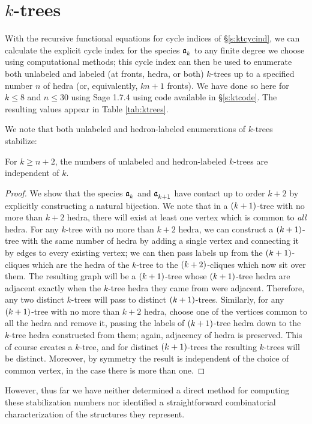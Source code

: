 \documentclass[distribution,draft]{brandiss} %
\numberwithin{section}{chapter}
\numberwithin{figure}{chapter}
\begin{document}
\section{$k$-trees}\label{s:ktenum}
With the recursive functional equations for cycle indices of \S \ref{s:ktcycind}, we can calculate the explicit cycle index for the species $\mathfrak{a}_{k}^{}$ to any finite degree we choose using computational methods; this cycle index can then be used to enumerate both unlabeled and labeled (at fronts, hedra, or both) $k$-trees up to a specified number $n$ of hedra (or, equivalently, $kn + 1$ fronts).
We have done so here for $k \leq 8$ and $n \leq 30$ using Sage 1.7.4 \cite{sage} using code available in \S \ref{s:ktcode}.
The resulting values appear in Table \ref{tab:ktrees}.

We note that both unlabeled and hedron-labeled enumerations of $k$-trees stabilize:
\begin{theorem}
  \label{thm:ktreestab}
  For $k \geq n + 2$, the numbers of unlabeled and hedron-labeled $k$-trees are independent of $k$.
\end{theorem}
\begin{proof}
  We show that the species $\mathfrak{a}_{k}^{}$ and $\mathfrak{a}_{k+1}^{}$ have contact up to order $k+2$ by explicitly constructing a natural bijection.
  We note that in a $\left( {k+1} \right)$-tree with no more than $k+2$ hedra, there will exist at least one vertex which is common to \emph{all} hedra.
  For any $k$-tree with no more than $k+2$ hedra, we can construct a $\left( {k+1} \right)$-tree with the same number of hedra by adding a single vertex and connecting it by edges to every existing vertex; we can then pass labels up from the $\left( {k+1} \right)$-cliques which are the hedra of the $k$-tree to the $\left( {k+2} \right)$-cliques which now sit over them.
  The resulting graph will be a $\left( {k+1} \right)$-tree whose $\left( {k+1} \right)$-tree hedra are adjacent exactly when the $k$-tree hedra they came from were adjacent.
  Therefore, any two distinct $k$-trees will pass to distinct $\left( {k+1} \right)$-trees.
  Similarly, for any $\left( {k+1} \right)$-tree with no more than $k+2$ hedra, choose one of the vertices common to all the hedra and remove it, passing the labels of $\left( {k+1} \right)$-tree hedra down to the $k$-tree hedra constructed from them; again, adjacency of hedra is preserved.
  This of course creates a $k$-tree, and for distinct $\left( {k+1} \right)$-trees the resulting $k$-trees will be distinct.
  Moreover, by symmetry the result is independent of the choice of common vertex, in the case there is more than one.
\end{proof}
However, thus far we have neither determined a direct method for computing these stabilization numbers nor identified a straightforward combinatorial characterization of the structures they represent.
\end{document}
